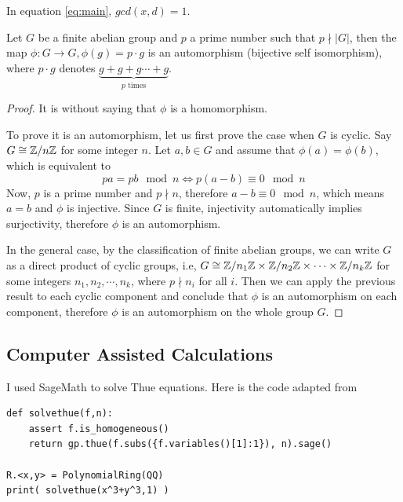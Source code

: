 \begin{conjecture}
	In equation \ref{eq:main}, $gcd(x, d) = 1$.
\end{conjecture}

\begin{lemma}\label{lem:automorphism}
	Let $G$ be a finite abelian group and $p$ a prime number such that $p \nmid |G|$, then the map $\phi: G \rightarrow G, \phi(g) = p\cdot g$ is an automorphism (bijective self isomorphism), where $p \cdot g$ denotes $\underbrace{g + g + g \cdots + g}_{p \text{ times}}$.
\end{lemma}

\begin{proof}
	It is without saying that $\phi$ is a homomorphism.

	To prove it is an automorphism, let us first prove the case when $G$ is cyclic.
	Say $G \cong \mathbb{Z}/n\mathbb{Z}$ for some integer $n$.
	Let $a, b \in G$ and assume that $\phi(a) = \phi(b)$, which is equivalent to 
	$$
		p a = p b \mod n \Leftrightarrow p(a - b) \equiv 0 \mod n
	$$
	Now, $p$ is a prime number and $p \nmid n$, therefore $a - b \equiv 0 \mod n$, which means $a = b$ and $\phi$ is injective.
	Since $G$ is finite, injectivity automatically implies surjectivity, therefore $\phi$ is an automorphism.

	In the general case, by the classification of finite abelian groups, we can write $G$ as a direct product of cyclic groups, i.e, $G \cong \mathbb{Z}/n_1\mathbb{Z} \times \mathbb{Z}/n_2\mathbb{Z} \times \cdots \times \mathbb{Z}/n_k\mathbb{Z}$ for some integers $n_1, n_2, \cdots, n_k$, where $p \nmid n_i$ for all $i$.
	Then we can apply the previous result to each cyclic component and conclude that $\phi$ is an automorphism on each component, therefore $\phi$ is an automorphism on the whole group $G$.
\end{proof}

\subsection{Computer Assisted Calculations}\label{sec:computer-assisted-calculations}

I used SageMath \cite{sage} to solve Thue equations.
Here is the code adapted from \cite{ThueCode}
\begin{lstlisting}[style=python]
def solvethue(f,n):
    assert f.is_homogeneous()
    return gp.thue(f.subs({f.variables()[1]:1}), n).sage()

R.<x,y> = PolynomialRing(QQ)
print( solvethue(x^3+y^3,1) )
\end{lstlisting}

